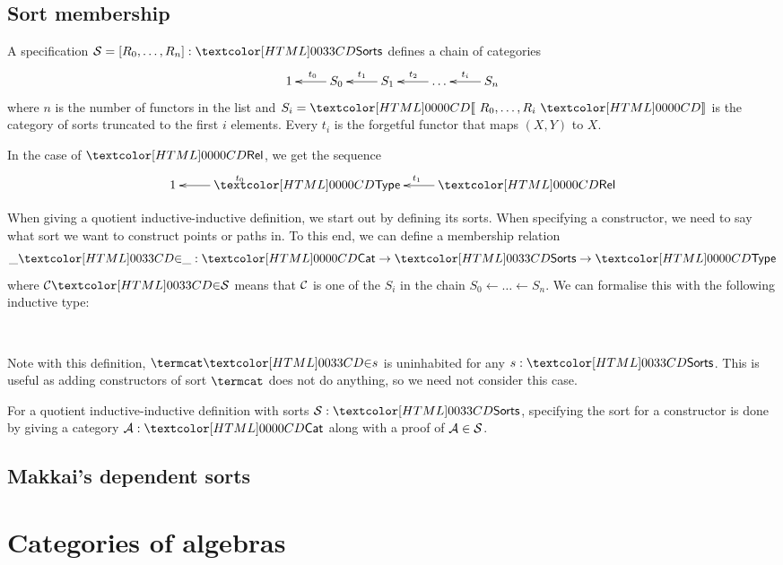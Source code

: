 \subsection{Sort membership}

A specification $\Ss = [R_0, \ldots, R_n] : \sortsty$ defines a chain of categories
\[
\xymatrix{
1 &S_0 \ar[l]_{t_0} &S_1 \ar[l]_{t_1} &\hdots \ar[l]_{t_2} &S_n \ar[l]_{t_i}
}
\]
where $n$ is the number of functors in the list and
$S_i = \SortCat{R_0, \ldots, R_i}$ is the category of sorts truncated
to the first $i$ elements. Every $t_i$ is the forgetful functor that
maps $(X,Y)$ to $X$.

\begin{example}
In the case of $\Rel$, we get the sequence
\[
\xymatrix{
1 &\Type \ar[l]_{t_0} &\Rel \ar[l]_{t_1}
}
\]
\end{example}

When giving a quotient inductive-inductive definition, we start out by
defining its sorts. When specifying a constructor, we need to say what
sort we want to construct points or paths in. To this end, we can
define a membership relation
$$
  \sortsin{\_}{\_} : \Cat \to \sortsty \to \Type
$$
where $\sortsin{\Cc}{\Ss}$ means that $\mathcal{C}$ is one of the $S_i$ in the chain
${S_0 \leftarrow \ldots \leftarrow S_n}$. We can formalise this with
the following inductive type:
%
\begin{datatype}{\sortsin{\_}{\_}}{\Cat \to \sortsty \to \Type}
   \\
\end{datatype}
%
Note with this definition, $\sortsin{\termcat}{s}$ is uninhabited for
any $s : \sortsty$. This is useful as adding constructors of sort
$\termcat$ does not do anything, so we need not consider this case.

For a quotient inductive-inductive definition with sorts
$\Ss : \sortsty$, specifying the sort for a constructor is done by
giving a category $\Aa : \Cat$ along with a proof of $\mathcal{A} \in \mathcal{S}$.

\subsection{Makkai's dependent sorts}

\section{Categories of algebras}

